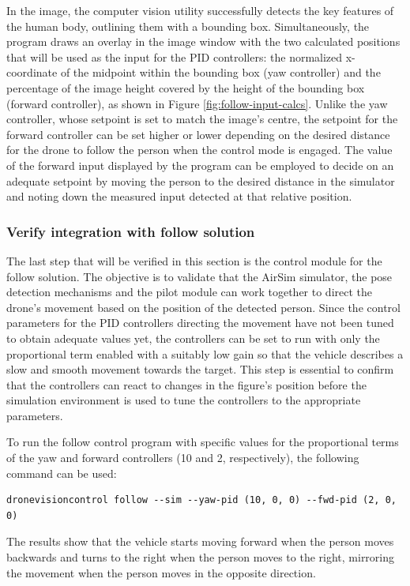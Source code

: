 In the image, the computer vision utility successfully detects the key features of the human body, outlining them with a bounding box. Simultaneously, the program draws an overlay in the image window with the two calculated positions that will be used as the input for the PID controllers: the normalized x-coordinate of the midpoint within the bounding box (yaw controller) and the percentage of the image height covered by the height of the bounding box (forward controller), as shown in Figure \ref{fig:follow-input-calcs}. Unlike the yaw controller, whose setpoint is set to match the image's centre, the setpoint for the forward controller can be set higher or lower depending on the desired distance for the drone to follow the person when the control mode is engaged.
The value of the forward input displayed by the program can be employed to decide on an adequate setpoint by moving the person to the desired distance in the simulator and noting down the measured input detected at that relative position.



\subsubsection{Verify integration with follow solution}

The last step that will be verified in this section is the control module for the follow solution. The objective is to validate that the AirSim simulator, the pose detection mechanisms and the pilot module can work together to direct the drone's movement based on the position of the detected person. Since the control parameters for the PID controllers directing the movement have not been tuned to obtain adequate values yet, the controllers can be set to run with only the proportional term enabled with a suitably low gain so that the vehicle describes a slow and smooth movement towards the target. This step is essential to confirm that the controllers can react to changes in the figure's position before the simulation environment is used to tune the controllers to the appropriate parameters.

To run the follow control program with specific values for the proportional terms of the yaw and forward controllers (10 and 2, respectively), the following command can be used:

\begin{verbatim}
dronevisioncontrol follow --sim --yaw-pid (10, 0, 0) --fwd-pid (2, 0, 0)
\end{verbatim}

The results show that the vehicle starts moving forward when the person moves backwards and turns to the right when the person moves to the right, mirroring the movement when the person moves in the opposite direction.


